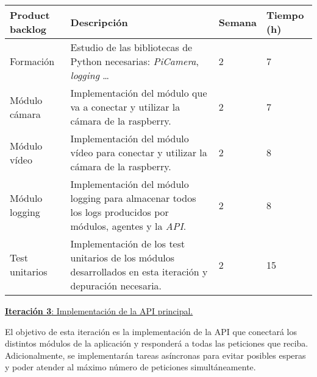 \begin{table}[h!]
\begin{tabular}{|p{4cm}|p{7.2cm}|p{1.3cm}|p{2.1cm}|}
\hline
\rowcolor[HTML]{9B9B9B} 
{\color[HTML]{FFFFFF} Product backlog} & {\color[HTML]{FFFFFF} Descripción}                                  & {\color[HTML]{FFFFFF} Semana} & {\color[HTML]{FFFFFF}Tiempo (h)} \\ \hline
Formación                             & Estudio de las bibliotecas de Python necesarias: \textit{PiCamera}, \textit{logging} \ldots
                                        & 2                             & 7                                   \\ \hline
Módulo cámara                        & Implementación del módulo que va a conectar y utilizar la cámara de la raspberry.
                                  & 2                             & 7                                  \\ \hline
Módulo vídeo                          & Implementación del módulo vídeo para conectar y utilizar la cámara de la raspberry.
          & 2                             & 8                                   \\ \hline
Módulo logging                         & Implementación del módulo logging para almacenar todos los logs producidos por módulos, agentes y la \textit{API}.
          & 2                             & 8                                   \\ \hline

Test unitarios                         & Implementación de los test unitarios de los módulos desarrollados en esta iteración y depuración necesaria. & 2 & 15 \\ \hline  

\end{tabular}
\end{table}

\newpage


\large{\underline{\textbf{Iteración 3}: Implementación de la API principal.}}
\vspace{0.3cm}

\normalsize

El objetivo de esta iteración es la implementación de la API que conectará los distintos módulos de la aplicación y responderá a todas las peticiones que reciba. Adicionalmente, se implementarán tareas asíncronas para evitar posibles esperas y poder atender al máximo número de peticiones simultáneamente.

